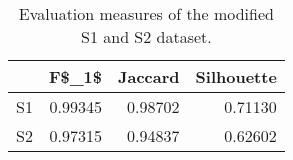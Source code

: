 \begin{table}
\centering
\caption{Evaluation measures of the modified S1 and S2 dataset.}
\label{tab:S1S2measures}
\begin{tabular}{lrrr}
\toprule
{} &   F\$\_1\$ &  Jaccard &  Silhouette \\
\midrule
S1 & 0.99345 &  0.98702 &     0.71130 \\
S2 & 0.97315 &  0.94837 &     0.62602 \\
\bottomrule
\end{tabular}
\end{table}
